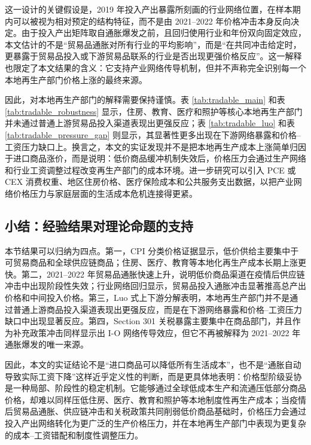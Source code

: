 \documentclass[12pt,a4paper,fontset=none]{ctexart}
\begin{document}
这一设计的关键假设是，2019 年投入产出暴露所刻画的行业网络位置，在样本期内可以被视为相对预定的结构特征，而不是由 2021--2022 年价格冲击本身反向决定。由于投入产出矩阵取自通胀爆发之前，且回归使用行业和年份双向固定效应，本文估计的不是“贸易品通胀对所有行业的平均影响”，而是“在共同冲击给定时，更暴露于贸易品投入或下游贸易品联系的行业是否出现更强价格反应”。这一解释也限定了本文结果的含义：它支持产业网络传导机制，但并不声称完全识别每一个本地再生产部门价格上涨的最终来源。

因此，对本地再生产部门的解释需要保持谨慎。表 \ref{tab:tradable_main} 和表 \ref{tab:tradable_robustness} 显示，住房、教育、医疗和照护等核心本地再生产部门并未通过普通上游贸易品投入渠道表现出更强反应；表 \ref{tab:tradable_luo} 和表 \ref{tab:tradable_pressure_gap} 则显示，其显著性更多出现在下游网络暴露和价格--工资压力缺口上。换言之，本文的实证发现并不是把本地再生产成本上涨简单归因于进口商品涨价，而是说明：低价商品缓冲机制失效后，价格压力会通过生产网络和行业工资调整过程改变再生产部门的成本环境。进一步研究可以引入 PCE 或 CEX 消费权重、地区住房价格、医疗保险成本和公共服务支出数据，以把产业网络价格压力与家庭层面的生活成本危机连接得更紧。

\subsection{小结：经验结果对理论命题的支持}

本节结果可以归纳为四点。第一，CPI 分类价格证据显示，低价供给主要集中于可贸易商品和全球供应链商品；住房、医疗、教育等本地化再生产成本长期上涨更快。第二，2021--2022 年贸易品通胀快速上升，说明低价商品渠道在疫情后供应链冲击中出现阶段性失效；行业网络回归显示，贸易品投入通胀冲击显著推高总产出价格和中间投入价格。第三，Luo 式上下游分解表明，本地再生产部门并不是通过普通上游商品投入渠道表现出更强反应，而是在下游网络暴露和价格--工资压力缺口中出现显著反应。第四，Section 301 关税暴露主要集中在商品部门，并且作为补充政策冲击同样显示出 I-O 网络传导效应，但它不再被解释为 2021--2022 年通胀爆发的唯一来源。

因此，本文的实证结论不是“进口商品可以降低所有生活成本”，也不是“通胀自动导致实际工资下降”这样近乎定义性的判断，而是更具体地表明：价格型阶级妥协是一种局部、阶段性的稳定机制。它能够通过全球低成本生产和流通压低部分商品价格，却难以同样压低住房、医疗、教育和照护等本地制度性再生产成本；当疫情后贸易品通胀、供应链冲击和关税政策共同削弱低价商品基础时，价格压力会通过投入产出网络转化为更广泛的生产价格压力，并在本地再生产部门中表现为更复杂的成本--工资错配和制度性调整压力。



\end{document}
